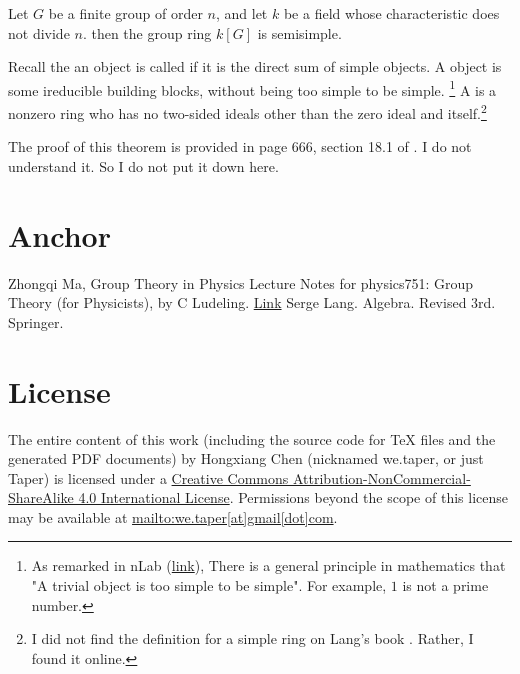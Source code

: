 \documentclass{article}
\begin{document}
\begin{thm}[Maschke]
    Let $G$ be a finite group of order $n$, and let $k$ be a field
    whose characteristic does not divide $n$. then the group ring
    $k[G]$ is semisimple.
\end{thm}
Recall the an object is called  if it is the direct
sum of simple objects. A  object is some ireducible
building blocks, without being too simple to be simple. \footnote{
    As remarked in nLab
    (\href{https://ncatlab.org/nlab/show/too+simple+to+be+simple}{link}),
    There is a general principle in mathematics that "A trivial object
    is too simple to be simple". For example, $1$ is not a prime
number.} A  is a nonzero ring who has no two-sided ideals
other than the zero ideal and itself.\footnote{ I did not find the
    definition for a simple ring on Lang's book \cite{lang-algebra}.
Rather, I found it online.}

The proof of this theorem is provided in page 666, section 18.1 of
\cite{lang-algebra}. I do not understand it. So I do not put it down
here.

\section{Anchor}
\label{sec:Anchor}

\begin{thebibliography}{1}
     Zhongqi Ma, Group Theory in Physics
     Lecture Notes for physics751: Group Theory (for
    Physicists), by C Ludeling.
    \href{http://www.th.physik.uni-bonn.de/nilles/people/luedeling/grouptheory/data/grouptheorynotes.pdf}{Link}
     Serge Lang. Algebra. Revised 3rd. Springer.
\end{thebibliography}
\printnomenclature
\section{License}
The entire content of this work (including the source code
for TeX files and the generated PDF documents) by 
Hongxiang Chen (nicknamed we.taper, or just Taper) is
licensed under a 
\href{http://creativecommons.org/licenses/by-nc-sa/4.0/}{Creative 
Commons Attribution-NonCommercial-ShareAlike 4.0 International 
License}. Permissions beyond the scope of this 
license may be available at \url{mailto:we.taper[at]gmail[dot]com}.
\end{document}
